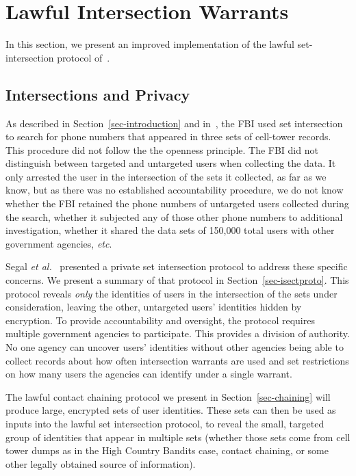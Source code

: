 \section{Lawful Intersection Warrants}\label{sec-intersection}
In this section, we present an improved implementation of the lawful
set-intersection protocol of~\cite{sff-foci2014}. 
\subsection{Intersections and Privacy}

As described in Section~\ref{sec-introduction} and in~\cite{sff-foci2014}, the FBI used
set intersection to search for phone numbers that appeared in three sets of
cell-tower records. This procedure did not follow the the openness principle.
The FBI did not distinguish between targeted and untargeted users when
collecting the data. It only arrested the user in the intersection of the sets
it collected, as far as we know, but as there was no established accountability
procedure, we do not know whether the FBI retained the phone numbers of
untargeted users collected during the search, whether it subjected any of those
other phone numbers to additional investigation, whether it shared the data sets
of 150,000 total users with other government agencies, \emph{etc}. 

Segal \emph{et al.}~\cite{sff-foci2014} presented a private set intersection
protocol to address these specific concerns. We present a summary of that protocol
in Section~\ref{sec-isectproto}. This protocol reveals \emph{only} the identities
of users in the intersection of the sets under consideration, leaving the other,
untargeted users' identities hidden by encryption. To provide accountability and
oversight, the protocol requires multiple government agencies to participate. This
provides a division of authority. No one agency can uncover users' identities
without other agencies being able to collect records about how often intersection
warrants are used and set restrictions on how many users the agencies can identify
under a single warrant.

The lawful contact chaining protocol we present in Section~\ref{sec-chaining} will
produce large, encrypted sets of user identities. These sets can then be used as
inputs into the lawful set intersection protocol, to reveal the small, targeted
group of identities that appear in multiple sets (whether those sets come from cell
tower dumps as in the High Country Bandits case, contact chaining, or some other
legally obtained source of information). 

